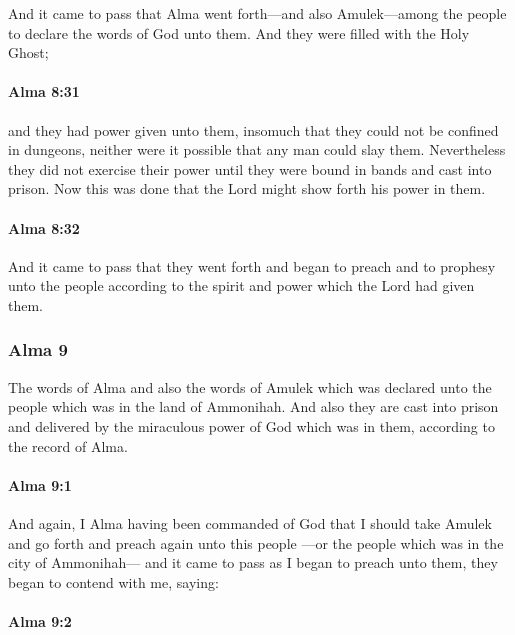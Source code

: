 			And it came to pass that
			Alma went forth---and also Amulek---among the people
			to declare the words of God unto them.
			And they were filled with the Holy Ghost;

		\paragraph{Alma 8:31} %
			\label{ALMA-8-31}

			and they had power given unto them,
			insomuch that they could not be confined in dungeons,
			neither were it possible that any man could slay them.
			Nevertheless they did not exercise their power
			until they were bound in bands and cast into prison.
			Now this was done that the Lord might show forth his power in them.

		\paragraph{Alma 8:32} %
			\label{ALMA-8-32}

			And it came to pass that they went forth
			and began to preach and to prophesy unto the people
			according to the spirit and power which the Lord had given them.

	\subsubsection{Alma 9} %
		\label{ALMA-9}
		
		The words of Alma and also the words of Amulek
		which was declared unto the people which was in the land of Ammonihah.
		And also they are cast into prison
		and delivered by the miraculous power of God which was in them,
		according to the record of Alma.

		\paragraph{Alma 9:1} %
			\label{ALMA-9-1}

			And again, I Alma having been commanded of God
			that I should take Amulek and go forth and preach again unto this people
			---or the people which was in the city of Ammonihah---
			and it came to pass as I began to preach unto them,
			they began to contend with me, saying:

		\paragraph{Alma 9:2} %
			\label{ALMA-9-2}

